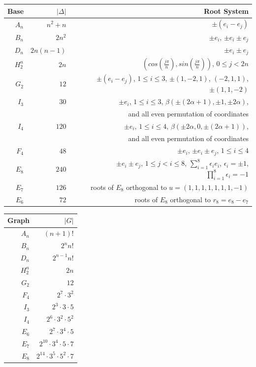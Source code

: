 \begin{center}
\begin{tabular} {|r|r|r|}
\hline
{\bf Base} & $|\Delta|$ & {\bf Root System} \\
\hline
$A_n$ & $n^2+n$ & $\pm (e_i - e_j)$ \\
\hline
$B_n$ & $2n^2$ &
$\pm e_i$, $\pm e_i \pm e_j$ \\
\hline
$D_n$ & $2n(n-1)$ &
$\pm e_i \pm e_j$ \\
\hline
$H_2^n$ & $2n$ &
$(cos({\frac {j \pi} {n}}), sin({\frac {j \pi} {n}})) $, $0 \le j <2n$\\
\hline
$G_2$ & $12$ & $\pm(e_i - e_j)$, $1 \le i \le 3$, $ \pm (1, -2, 1)$, $(-2, 1,1)$, $\pm(1,1, -2)$ \\
\hline
$I_3$ & $30$ &
$ \pm e_i$, $1 \le i \le 3$, $\beta ( \pm (2 \alpha +1), \pm 1, \pm 2 \alpha)$,\\
& &  and all even permutation of coordinates\\
\hline
$I_4$ &  $120$ & $ \pm e_i$, $1 \le i \le 4$, $\beta ( \pm 2 \alpha , 0,  \pm (2 \alpha +1) )$, \\
& &  and all even permutation of coordinates\\
\hline
$F_4$ &  $48$ &
$ \pm e_i$, $\pm e_i \pm e_j$, $1 \le i \le 4$ \\
\hline
$E_8$ & $240$ &
$ \pm e_i \pm e_j $, $1 \le j < i \le 8$, $\sum_{i=1}^8 \epsilon_i e_i$, $\epsilon_i = \pm 1$,
$\prod_{i=1}^8 \epsilon_i = -1$ \\
\hline
$E_7$ & $126$ & roots of $E_8$ orthogonal to $u= (1,1,1,1,1,1,1,-1)$ \\
\hline
$E_6$ & $72$ & roots of $E_8$ orthogonal to $r_8= e_8 - e_7$ \\
\hline
\end{tabular}
\end{center}
\begin{center}
\begin{tabular} {|r|r|}
\hline
{\bf Graph} & $|G|$ \\
\hline
$A_n$ &  $(n+1)!$ \\
\hline
$B_n$ &  $2^n n!$ \\
\hline
$D_n$ &  $2^{n-1} n!$ \\
\hline
$H_2^n$ & $2n$ \\
\hline
$G_2$ &  $12$ \\
\hline
$F_4$ &  $2^{7} \cdot 3^{2}$ \\
\hline
$I_3$ &  $2^{3} \cdot 3 \cdot 5$ \\
\hline
$I_4$ &  $2^{6} \cdot 3^{2} \cdot 5^2$ \\
\hline
$E_6$ &  $2^{7} \cdot 3^{4} \cdot 5$ \\
\hline
$E_7$ &  $2^{10} \cdot 3^{4} \cdot 5 \cdot 7$ \\
\hline
$E_8$ &  $2^{14} \cdot 3^{5} \cdot 5^2 \cdot 7$ \\
\hline
\end{tabular}
\end{center}
